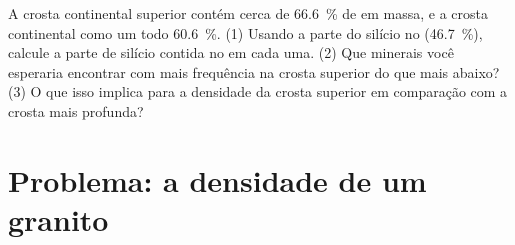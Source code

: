\begin{exercise}[$\star\star\star$]\label{exo:g11:minerals:15}
A crosta continental superior contém cerca de \qty{66.6}{\percent} de
 em massa, e a crosta continental como um todo
\qty{60.6}{\percent}. (1) Usando a parte do silício no 
(\qty{46.7}{\percent}), calcule a parte de silício contida no  em
cada uma. (2) Que minerais você esperaria encontrar com mais frequência na
crosta superior do que mais abaixo? (3) O que isso implica para a densidade
da crosta superior em comparação com a crosta mais profunda?
\end{exercise}

\section{Problema: a densidade de um granito}

